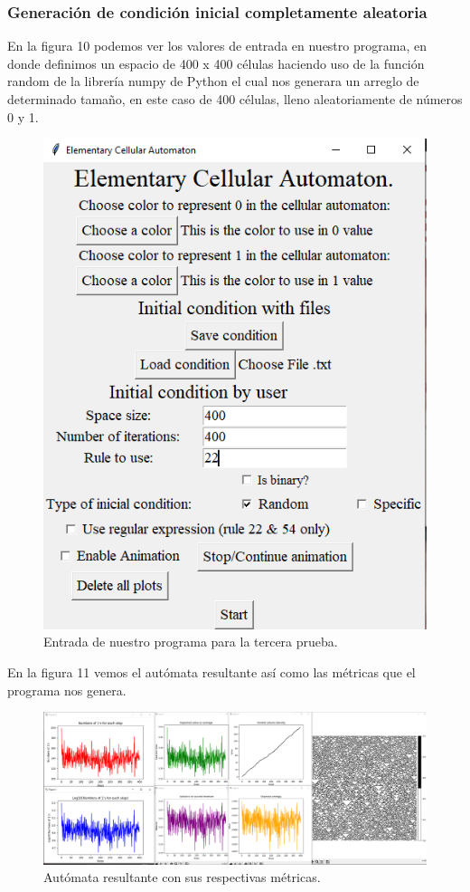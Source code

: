 \documentclass[11pt]{article}
\begin{document}
		\subsubsection{Generación de condición inicial completamente aleatoria}
		En la figura 10 podemos ver los valores de entrada en nuestro programa, en donde definimos un espacio de 400 x 400 células haciendo uso de la función random de la librería numpy de Python el cual nos generara un arreglo de determinado tamaño, en este caso de 400 células, lleno aleatoriamente de números 0 y 1.		
		\begin{figure}[H]
			\centering
			\includegraphics[scale=0.5]{resources/RegEx22/random_entrada.png}
			\caption{Entrada de nuestro programa para la tercera prueba.}\label{fig:picture}
		\end{figure}
		En la figura 11 vemos el autómata resultante así como las métricas que el programa nos genera.
		\begin{figure}[H]
			\includegraphics[scale=0.26]{resources/RegEx22/random_result.png}
			\caption{Autómata resultante con sus respectivas métricas.}\label{fig:picture}
		\end{figure}		
\end{document}
